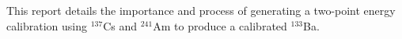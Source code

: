 This report details the importance and process of generating a two-point
energy calibration using $^{137}$Cs and $^{241}$Am to produce a calibrated
$^{133}$Ba.

